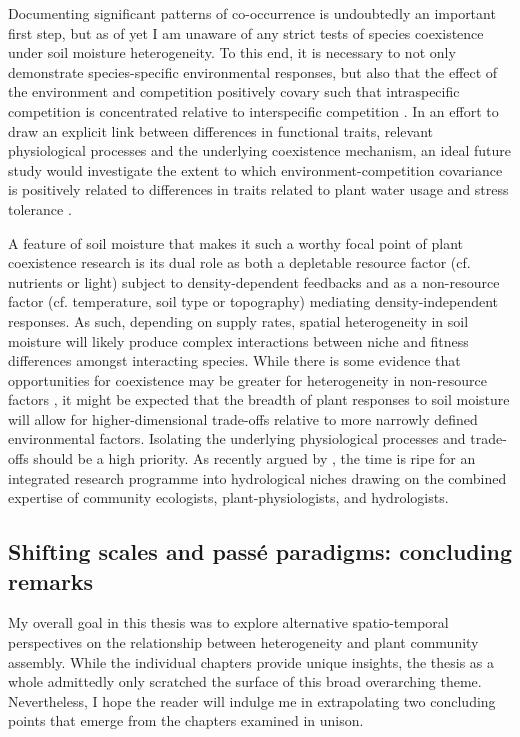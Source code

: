 Documenting significant patterns of co-occurrence is undoubtedly an important first step, but as of yet I am unaware of any strict tests of species coexistence under soil moisture heterogeneity. To this end, it is necessary to not only demonstrate species-specific environmental responses, but also that the effect of the environment and competition positively covary such that intraspecific competition is concentrated relative to interspecific competition \citep{Chesson2000c, Chesson2000, Sears2007a, Adler2007}. In an effort to draw an explicit link between differences in functional traits, relevant physiological processes and the underlying coexistence mechanism, an ideal future study would investigate the extent to which environment-competition covariance is positively related to differences in traits related to plant water usage and stress tolerance \citep{Adler2013}.
 
A feature of soil moisture that makes it such a worthy focal point of plant coexistence research is its dual role as both a depletable resource factor (cf. nutrients or light) subject to density-dependent feedbacks and as a non-resource factor (cf. temperature, soil type or topography) mediating density-independent responses. As such, depending on supply rates, spatial heterogeneity in soil moisture will likely produce complex interactions between niche and fitness differences amongst interacting species. While there is some evidence that opportunities for coexistence may be greater for heterogeneity in non-resource factors \citep{schoolmaster2013}, it might be expected that the breadth of plant responses to soil moisture will allow for higher-dimensional trade-offs relative to more narrowly defined environmental factors. Isolating the underlying physiological processes and trade-offs should be a high priority. As recently argued by \citet{Silvertown2015}, the time is ripe for an integrated research programme into hydrological niches drawing on the combined expertise of community ecologists, plant-physiologists, and hydrologists. 

\subsection*{Shifting scales and pass\'{e} paradigms: concluding remarks} 

My overall goal in this thesis was to explore alternative spatio-temporal perspectives on the relationship between heterogeneity and plant community assembly. While the individual chapters provide unique insights, the thesis as a whole admittedly only scratched the surface of this broad overarching theme. Nevertheless, I hope the reader will indulge me in extrapolating two concluding points that emerge from the chapters examined in unison. 

